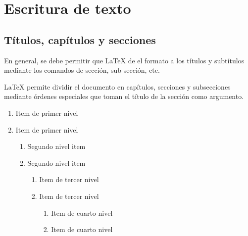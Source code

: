 \documentclass[a4,11pt]{aleph-notas-alpha}
\begin{document}
\encabezado

\informacion

\tableofcontents

\newpage
\vspace*{-18mm}
\section{Escritura de texto}
\subsection{Títulos, capítulos y secciones}

\begin{advertencia}
En general, se debe permitir que \LaTeX{} de el formato a los títulos y subtítulos mediante los comandos de sección, sub-sección, etc.
\end{advertencia}

\LaTeX{} permite dividir el documento en capítulos, secciones y subsecciones mediante órdenes especiales que toman el título de la sección como argumento.



\begin{tcbLaTeXs}
 \begin{enumerate}
   \item 
        Item de primer nivel
   \item
        Item de primer nivel
   \begin{enumerate}
    \item
        Segundo nivel item
    \item
        Segundo nivel item
     \begin{enumerate}
       \item Item de tercer nivel
       \item Item de tercer nivel
       \begin{enumerate}
         \item Item de cuarto nivel
         \item Item de cuarto nivel
       \end{enumerate}
     \end{enumerate}
   \end{enumerate}
 \end{enumerate}
\end{tcbLaTeXs}
\end{document}

